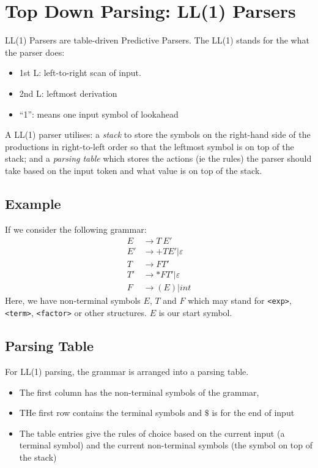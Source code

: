 \section{Top Down Parsing: LL(1) Parsers}
LL(1) Parsers are table-driven Predictive Parsers. The LL(1) stands for the what the parser does:
\begin{itemize}
    \item 1st L: left-to-right scan of input.
    \item 2nd L: leftmost derivation
    \item ``1'': means one input symbol of lookahead
\end{itemize}

A LL(1) parser utilises: a \textit{stack} to store the symbols on the right-hand side of the productions in right-to-left order so that the leftmost symbol is on top of the stack; and a \textit{parsing table} which stores the actions (ie the rules) the parser should take based on the input token and what value is on top of the stack. 

\subsection{Example}
If we consider the following grammar:
\begin{align*}
    E & \rightarrow T\ E'\\
    E' & \rightarrow +TE' | \varepsilon\\
    T & \rightarrow FT'\\
    T' & \rightarrow *FT' | \varepsilon\\
    F & \rightarrow (E) | int
\end{align*}
Here, we have non-terminal symbols $E$, $T$ and $F$ which may stand for \verb|<exp>|, \verb|<term>|, \verb|<factor>| or other structures. $E$ is our start symbol.


\subsection{Parsing Table}
For LL(1) parsing, the grammar is arranged into a parsing table.
\begin{itemize}
    \item The first column has the non-terminal symbols of the grammar,
    \item THe first row contains the terminal symbols and $\$$ is for the end of input 
    \item The table entries give the rules of choice based on the current input (a terminal symbol) and the current non-terminal symbols (the symbol on top of the stack)
\end{itemize}

